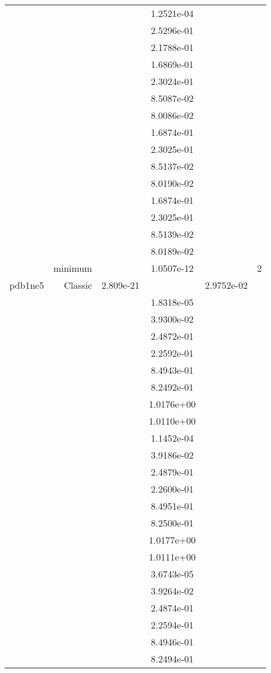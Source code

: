 \begin{xltabular}{\textwidth}{r|rS[table-format=1.3e+2]S[table-format=1.4e+2]S[table-format=1.4e+2]S[table-format=-1.5]}
&  &  & 1.2521e-04 & & \\
&  &  & 2.5296e-01 & & \\
&  &  & 2.1788e-01 & & \\
&  &  & 1.6869e-01 & & \\
&  &  & 2.3024e-01 & & \\
&  &  & 8.5087e-02 & & \\
&  &  & 8.0086e-02 & & \\
&  &  & 1.6874e-01 & & \\
&  &  & 2.3025e-01 & & \\
&  &  & 8.5137e-02 & & \\
&  &  & 8.0190e-02 & & \\
&  &  & 1.6874e-01 & & \\
&  &  & 2.3025e-01 & & \\
&  &  & 8.5139e-02 & & \\
&  &  & 8.0189e-02 & & \\
& minimum &  & 1.0507e-12 & & 2 \\  \addlinespace
pdb1ne5 & Classic & 2.809e-21 &  & 2.9752e-02 & \\
&  &  & 1.8318e-05 & & \\
&  &  & 3.9300e-02 & & \\
&  &  & 2.4872e-01 & & \\
&  &  & 2.2592e-01 & & \\
&  &  & 8.4943e-01 & & \\
&  &  & 8.2492e-01 & & \\
&  &  & 1.0176e+00 & & \\
&  &  & 1.0110e+00 & & \\
&  &  & 1.1452e-04 & & \\
&  &  & 3.9186e-02 & & \\
&  &  & 2.4879e-01 & & \\
&  &  & 2.2600e-01 & & \\
&  &  & 8.4951e-01 & & \\
&  &  & 8.2500e-01 & & \\
&  &  & 1.0177e+00 & & \\
&  &  & 1.0111e+00 & & \\
&  &  & 3.6743e-05 & & \\
&  &  & 3.9264e-02 & & \\
&  &  & 2.4874e-01 & & \\
&  &  & 2.2594e-01 & & \\
&  &  & 8.4946e-01 & & \\
&  &  & 8.2494e-01 & & \\

\end{xltabular}
